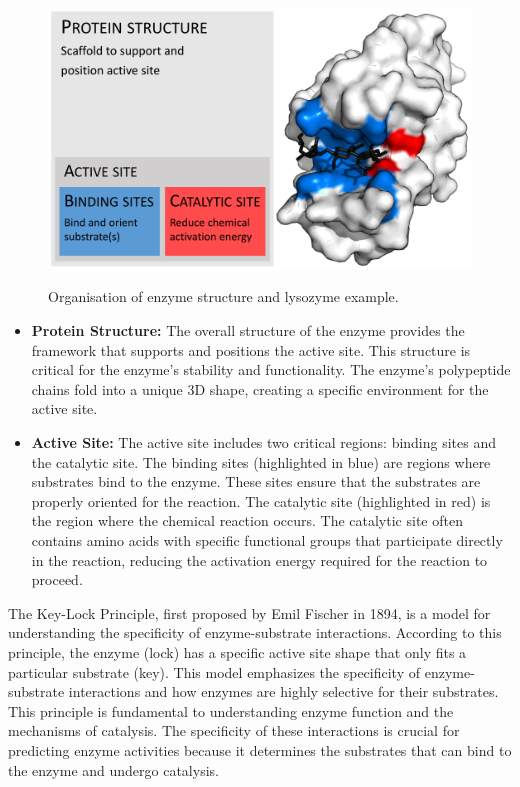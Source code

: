 \begin{figure}[hbt]
    \centering
    \begin{minipage}[t]{.9\textwidth}
    \caption{Organisation of enzyme structure and lysozyme example.}
    \includegraphics[width=1\textwidth]{img/EnzymeStructure.svg.png}\\
    \label{fig:EnzymeStructure}
    \end{minipage}
\end{figure}

\begin{itemize}
    \item \textbf{Protein Structure:} The overall structure of the enzyme provides the framework that supports and positions the active site. This structure is critical for the enzyme's stability and functionality. The enzyme's polypeptide chains fold into a unique 3D shape, creating a specific environment for the active site.
    \item \textbf{Active Site:} The active site includes two critical regions: binding sites and the catalytic site. The binding sites (highlighted in blue) are regions where substrates bind to the enzyme. These sites ensure that the substrates are properly oriented for the reaction. The catalytic site (highlighted in red) is the region where the chemical reaction occurs. The catalytic site often contains amino acids with specific functional groups that participate directly in the reaction, reducing the activation energy required for the reaction to proceed.
\end{itemize}

The Key-Lock Principle, first proposed by Emil Fischer in 1894, is a model for understanding the specificity of enzyme-substrate interactions. According to this principle, the enzyme (lock) has a specific active site shape that only fits a particular substrate (key). This model emphasizes the specificity of enzyme-substrate interactions and how enzymes are highly selective for their substrates. This principle is fundamental to understanding enzyme function and the mechanisms of catalysis. The specificity of these interactions is crucial for predicting enzyme activities because it determines the substrates that can bind to the enzyme and undergo catalysis.

